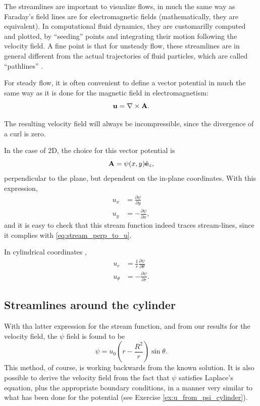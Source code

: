 The streamlines are important to visualize flows, in much the same way
as Faraday's field lines are for electromagnetic fields
(mathematically, they are equivalent). In computational fluid
dynamics, they are customarilly computed and plotted, by ``seeding''
points and integrating their motion following the velocity field.  A
fine point is that for unsteady flow, these streamlines are in general
different from the actual trajectories of fluid particles, which are
called ``pathlines'' .


For steady flow, it is often convenient to define a vector potential
 in much the same way as it is done for the
magnetic field in electromagnetism:
\begin{equation}
  \label{eq:vector_potential}
  \mathbf{u} = \nabla\times \mathbf{A} .
\end{equation}

The resulting velocity field will always be incompressible, since the
divergence of a curl is zero.

In the case of 2D, the choice for this vector potential is
\begin{equation}
  \label{eq:A_psi_2D}
  \mathbf{A} = \psi(x,y) \hat{\mathbf{e}}_z ,    
\end{equation}
perpendicular to the plane, but dependent on the in-plane
coordinates. With this expression,
\begin{align*}
  u_x &=  \frac{\partial \psi}{\partial y} \\
  u_y &= -\frac{\partial \psi}{\partial x} ,
\end{align*}
and it is easy to check that this stream function indeed traces
stream-lines, since it complies with \ref{eq:stream_perp_to_u}.

In cylindrical coordinates \cite{wiki:del},
\begin{align*}
u_r &= \frac1r \frac{\partial \psi}{\partial \theta} \\
u_\theta &=   - \frac{\partial \psi}{\partial r} .
\end{align*}


\subsection{Streamlines around the cylinder}

With tha latter expression for the stream function, and from our
results for the velocity field, the $\psi$ field is found to be
\[
\psi = u_0 \left( r-{\frac {R^{2}}{r}}\right)\sin \theta .
\]
This method, of course, is working backwards from the known
solution. It is also possible to derive the velocity field from the
fact that $\psi$ satisfies Laplace's equation, plus the appropriate
boundary conditions, in a manner very similar to what has been done
for the potential (see Exercise \ref{ex:u_from_psi_cylinder}).

